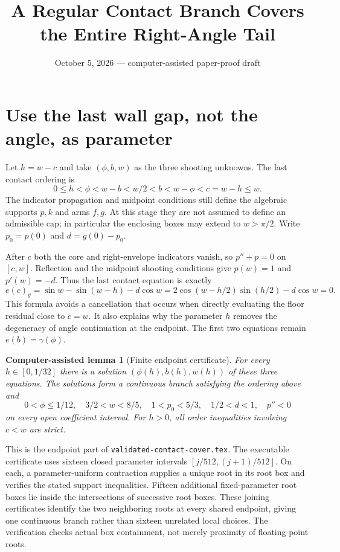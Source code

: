 \documentclass[11pt]{article}
\title{A Regular Contact Branch Covers the Entire Right-Angle Tail}
\author{}\date{October 5, 2026 --- computer-assisted paper-proof draft}
\newtheorem{fact}[theorem]{Computer-assisted lemma}
\begin{document}
\maketitle

\section{Use the last wall gap, not the angle, as parameter}
Let $h=w-c$ and take $(\phi,b,w)$ as the three shooting unknowns. The last contact ordering is
\[
 0\le h<\phi<w-b<w/2<b<w-\phi<c=w-h\le w.
\]
The indicator propagation and midpoint conditions still define the algebraic supports $p,k$ and arms $f,g$. At this stage they are not assumed to define an admissible cap; in particular the enclosing boxes may extend to $w>\pi/2$. Write $p_0=p(0)$ and $d=g(0)-p_0$.

After $c$ both the core and right-envelope indicators vanish, so $p''+p=0$ on $[c,w]$. Reflection and the midpoint shooting conditions give $p(w)=1$ and $p'(w)=-d$. Thus the last contact equation is exactly
\begin{equation}\label{eq:floor}
 e(c)_y=\sin w-\sin(w-h)-d\cos w
       =2\cos(w-h/2)\sin(h/2)-d\cos w=0.
\end{equation}
This formula avoids a cancellation that occurs when directly evaluating the floor residual close to $c=w$. It also explains why the parameter $h$ removes the degeneracy of angle continuation at the endpoint. The first two equations remain $e(b)=\gamma(\phi)$.

\begin{fact}[Finite endpoint certificate]\label{fact:certificate}
For every $h\in[0,1/32]$ there is a solution $(\phi(h),b(h),w(h))$ of these three equations. The solutions form a continuous branch satisfying the ordering above and
\[
 0<\phi\le1/12,\quad 3/2<w<8/5,\quad
 1<p_0<5/3,\quad 1/2<d<1,\quad p''<0
\]
on every open coefficient interval. For $h>0$, all order inequalities involving $c<w$ are strict.
\end{fact}

This is the endpoint part of \texttt{validated-contact-cover.tex}. The executable certificate uses sixteen closed parameter intervals $[j/512,(j+1)/512]$. On each, a parameter-uniform contraction supplies a unique root in its root box and verifies the stated support inequalities. Fifteen additional fixed-parameter root boxes lie inside the intersections of successive root boxes. These joining certificates identify the two neighboring roots at every shared endpoint, giving one continuous branch rather than sixteen unrelated local choices. The verification checks actual box containment, not merely proximity of floating-point roots.
\end{document}
